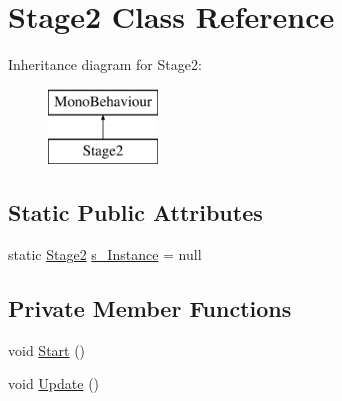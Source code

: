 \hypertarget{class_stage2}{}\section{Stage2 Class Reference}
\label{class_stage2}
Inheritance diagram for Stage2\+:\begin{figure}[H]
\begin{center}
\leavevmode
\includegraphics[height=2.000000cm]{class_stage2}
\end{center}
\end{figure}
\subsection*{Static Public Attributes}
\begin{DoxyCompactItemize}
\item 
static \mbox{\hyperlink{class_stage2}{Stage2}} \mbox{\hyperlink{class_stage2_ab0b9069fe51d69bfbe6b847dccd5dbd4}{s\+\_\+\+Instance}} = null
\end{DoxyCompactItemize}
\subsection*{Private Member Functions}
\begin{DoxyCompactItemize}
\item 
void \mbox{\hyperlink{class_stage2_a6ef397aad3d634caf09da4dc09dfeffa}{Start}} ()
\item 
void \mbox{\hyperlink{class_stage2_a50f93eb0e6e1ef6e71d85df9f951f189}{Update}} ()
\end{DoxyCompactItemize}
